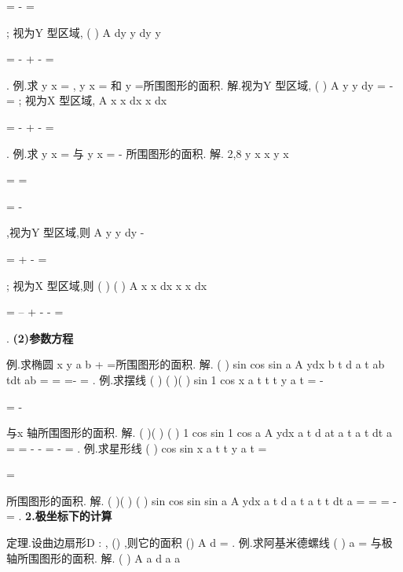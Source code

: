 =
-
=




\int 
; 
视为Y 型区域,
(
)
A
dy
y dy
y


=
-
+
-
=






\int 
\int 
. 
\textcolor{lyred}{例}.求
y
x
=
,
y
x
=
和
y =所围图形的面积. 
解.视为Y 型区域,
(
)
A
y
y dy
=
-
=
\int 
; 
视为X 型区域,
A
x
x
dx
x
dx




=
-
+
-
=








\int 
\int 
. 
\textcolor{lyred}{例}.求
y
x
=
与
y
x
=
-
所围图形的面积. 
解.
2,8
y
x
x
y
x

=
\Rightarrow 
=

=
-

,视为Y 型区域,则
A
y
y
dy
-


=
+
-
=




\int 
; 
视为X 型区域,则
(
)
(
)
A
x
x
dx
x
x
dx




=
--
+
-
-
=




\int 
\int 
. 
{\bfseries \textcolor{lyred}{(2)参数方程}}

\textcolor{lyred}{例}.求椭圆
x
y
a
b
+
=所围图形的面积. 
解.
(
)
sin
cos
sin
a
A
ydx
b
t d a
t
ab
tdt
ab
\pi 
\pi 
\pi 
=
=
\cdots 
=-
=
\int 
\int 
\int 
. 
\textcolor{lyred}{例}.求摆线
(
)
(
)(
)
sin
1 cos
x
a t
t
t
y
a
t
\pi 
=
-

\le \le 

=
-

与x 轴所围图形的面积. 
解.
(
)(
)
(
)
1 cos
sin
1 cos
a
A
ydx
a
t d at
a
t
a
t
dt
a
\pi 
\pi 
\pi 
\pi 
=
=
-
-
=
-
=
\int 
\int 
\int 
. 
\textcolor{lyred}{例}.求星形线
(
)
cos
sin
x
a
t
t
y
a
t
\pi 
=
\le \le 

=

所围图形的面积. 
解.
(
)(
)
(
)
sin
cos
sin
sin
a
A
ydx
a
t d a
t
a
t
t dt
a
\pi 
\pi 
\pi 
=
=
=
-
=
\int 
\int 
\int 
. 
{\bfseries \textcolor{lyred}{2.极坐标下的计算}}

\textcolor{lyred}{定理}.设\textcolor{lyred}{曲边扇形}D :\alpha 
\theta 
\beta 
\le 
\le 
,
()
\rho 
\varphi \theta 
\le 
\le 
,则它的面积
()
A
d
\beta 
\alpha 
\varphi 
\theta 
\theta 
=\int 
. 
\textcolor{lyred}{例}.求阿基米德螺线
(
)
a
\rho 
\theta 
\theta 
\pi 
=
\le 
\le 
与极轴所围图形的面积. 
解.
(
)
A
a
d
a
a
\pi 
\pi 
\theta 
\theta 
\theta 
\pi 



